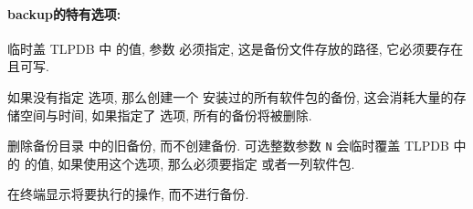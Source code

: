\paragraph{\textmd{\ac{backup}}的特有选项:}
\begin{description}
    \item {} \par
    临时盖 TLPDB 中  的值, 参数  必须指定, 这是备份文件存放的路径, 它必须要存在且可写. 
    \item {}\par
    如果没有指定  选项, 那么创建一个 \tl 安装过的所有软件包的备份, 这会消耗大量的存储空间与时间, 如果指定了  选项, 所有的备份将被删除. 
    \item {}\par
    删除备份目录  中的旧备份, 而不创建备份. 可选整数参数 \texttt{N} 会临时覆盖 TLPDB 中的  的值, 如果使用这个选项, 那么必须要指定  或者一列软件包. 
    \item {}\par
    在终端显示将要执行的操作, 而不进行备份. 
\end{description} 

